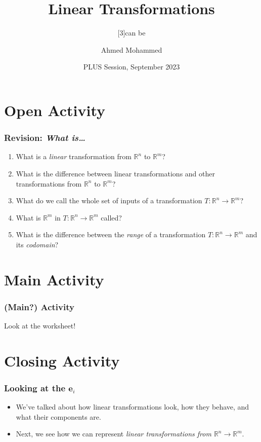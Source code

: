 \documentclass{beamer}
\title{Linear Transformations}
\subtitle{\rotatebox{-27}{They} \scalebox{2}[3]{can} be \rotatebox{27}{great}}
\author{Ahmed Mohammed}
\institute{Georgia Institute of Technology}
\date{PLUS Session, September 2023}
\renewcommand{\vec}[1]{\bm{#1}}
\begin{document}
	\begin{frame}
		\maketitle
	\end{frame}
	
	\section{Open Activity}
	\begin{frame}
		\frametitle{Revision: \textit{What is\dots}}
		\begin{enumerate}[<+(1)->]
			\item What is a \textit{linear} transformation from \(\mathbb{R}^n\) to \(\mathbb{R}^m\)?
			\item What is the difference between linear transformations and other transformations from \(\mathbb{R}^n\) to \(\mathbb{R}^m\)?
			\item What do we call the whole set of inputs of a transformation \(T \colon \mathbb{R}^n \to \mathbb{R}^m\)?
			\item What is \(\mathbb{R}^m\) in \(T \colon \mathbb{R}^n \to \mathbb{R}^m\) called?
			\item What is the difference between the \emph{range} of a transformation \(T\colon\mathbb{R}^n\to\mathbb{R}^m\) and its \emph{codomain}?
		\end{enumerate}
	\end{frame}

	\section{Main Activity}
	\begin{frame}
		\frametitle{(Main?) Activity}
		\centering Look at the worksheet!
	\end{frame}

	\section{Closing Activity}
	\begin{frame}
		\frametitle{Looking at the \(\vec{e}_i\)}
		\begin{itemize}
			\item<1-> We've talked about how linear transformations look, how they behave, and what their components are.
			\item<2-> Next, we see how we can represent \textit{linear transformations from \(\mathbb{R}^n \to \mathbb{R}^m\)}.
		\end{itemize}
	\end{frame}
\end{document}
